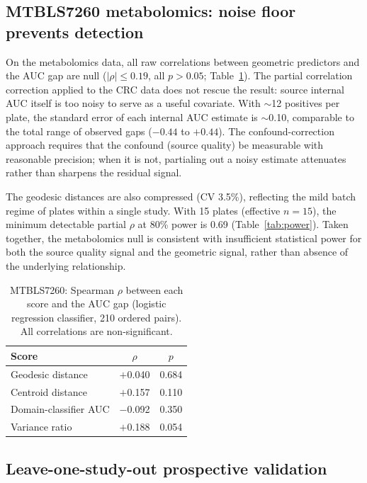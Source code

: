 \documentclass{article}
\begin{document}
\subsection{MTBLS7260 metabolomics: noise floor prevents detection}
\label{sec:metabolomics}

On the metabolomics data, all raw correlations between geometric predictors and the AUC gap are null ($|\rho| \leq 0.19$, all $p > 0.05$; Table~\ref{tab:baselines_metab}). The partial correlation correction applied to the CRC data does not rescue the result: source internal AUC itself is too noisy to serve as a useful covariate. With $\sim$12 positives per plate, the standard error of each internal AUC estimate is $\sim$0.10, comparable to the total range of observed gaps ($-0.44$ to $+0.44$). The confound-correction approach requires that the confound (source quality) be measurable with reasonable precision; when it is not, partialing out a noisy estimate attenuates rather than sharpens the residual signal.

The geodesic distances are also compressed (CV 3.5\%), reflecting the mild batch regime of plates within a single study. With 15 plates (effective $n = 15$), the minimum detectable partial $\rho$ at 80\% power is 0.69 (Table~\ref{tab:power}). Taken together, the metabolomics null is consistent with insufficient statistical power for both the source quality signal and the geometric signal, rather than absence of the underlying relationship.

\begin{table}[t]
\centering
\caption{MTBLS7260: Spearman $\rho$ between each score and the AUC gap (logistic regression classifier, 210 ordered pairs). All correlations are non-significant.}
\label{tab:baselines_metab}
\begin{tabular}{lcc}
\toprule
Score & $\rho$ & $p$ \\
\midrule
Geodesic distance     & $+$0.040 & 0.684 \\
Centroid distance     & $+$0.157 & 0.110 \\
Domain-classifier AUC & $-$0.092 & 0.350 \\
Variance ratio        & $+$0.188 & 0.054 \\
\bottomrule
\end{tabular}
\end{table}


\subsection{Leave-one-study-out prospective validation}
\label{sec:loo}
\end{document}
